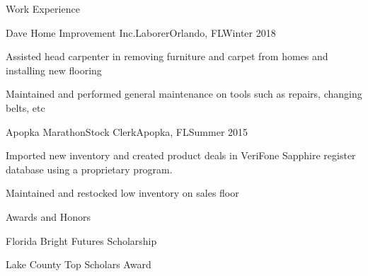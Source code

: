 \documentclass{article}
\newlength{\tabin}
\newlength{\secsep}
\newcommand{\lineunder}{\vspace*{-8pt} \\ \hspace*{-6pt} \hrulefill \\ \vspace*{-15pt}}
\newenvironment{tabbedsection}[1]{
  \begin{list}{}{
      \setlength{\itemsep}{0pt}
      \setlength{\labelsep}{0pt}
      \setlength{\labelwidth}{0pt}
      \setlength{\leftmargin}{\tabin}
      \setlength{\rightmargin}{\tabin}
      \setlength{\listparindent}{0pt}
      \setlength{\parsep}{0pt}
      \setlength{\parskip}{0pt}
      \setlength{\partopsep}{0pt}
      \setlength{\topsep}{#1}
    }
  \item[]
}{\end{list}}
\newenvironment{resume_section}[1]{ 
  \filbreak
  \vspace{2\secsep}
  \MakeUppercase{ \large#1}
  \lineunder
  \begin{tabbedsection}{\secsep}
}{\end{tabbedsection}}
\newenvironment{resume_subsection2}[2][]{
  \textbf{#2} \hfill {\footnotesize #1} \hspace{2em}
}
\newenvironment{subitems}{
  \renewcommand{\labelitemi}{-}
  \begin{itemize}
      \setlength{\labelsep}{1em}
}{\end{itemize}}
\newenvironment{resume_employer}[4]{
  \vspace{\secsep}
  \textbf{#1} \\ 
  \indent {\small #2} \hfill {\footnotesize#3 (#4)}
  \begin{tabbedsection}{0pt}
  \begin{subitems}
}{\end{subitems}\end{tabbedsection}}
\begin{document}
\begin{resume_section}{Work Experience}
  \begin{resume_employer}{Dave Home Improvement  Inc.}{Laborer}{Orlando, FL}{Winter 2018}
    \item Assisted head carpenter in removing furniture and carpet from homes and installing new flooring
    \item Maintained and performed general maintenance on tools such as repairs, changing belts, etc
  \end{resume_employer}
  
  \begin{resume_employer}{Apopka Marathon}{Stock Clerk}{Apopka, FL}{Summer 2015}
    \item Imported new inventory and created product deals in VeriFone Sapphire register database using a proprietary program.
    \item Maintained and restocked low inventory on sales floor
  \end{resume_employer}
\end{resume_section}


\begin{resume_section}{Awards and Honors}
    \begin{resume_subsection2}{Florida Bright Futures Scholarship}
    \end{resume_subsection2}
    
    \begin{resume_subsection2}[May 2016]{Lake County Top Scholars Award}
    \end{resume_subsection2}
\end{resume_section}


\end{document}
